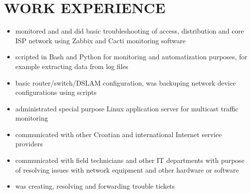 \documentclass{cv}
\begin{document}
\section{WORK EXPERIENCE}
\begin{itemize}
    \setlength\itemsep{0.1cm}
    \item monitored and and did basic troubleshooting of access, distribution and core ISP network using Zabbix and
Cacti monitoring software
    \item scripted in Bash and Python for monitoring and automatization purposes, for example extracting data from log
files
    \item basic router/switch/DSLAM configuration, was backuping network device configurations using scripts
    \item administrated special purpose Linux application server for multicast traffic monitoring
    \item communicated with other Croatian and international Internet service providers
    \item communicated with field technicians and other IT departments with purpose of resolving issues with
network equipment and other hardware or software
    \item was creating, resolving and forwarding trouble tickets
\end{itemize}
\end{document}
